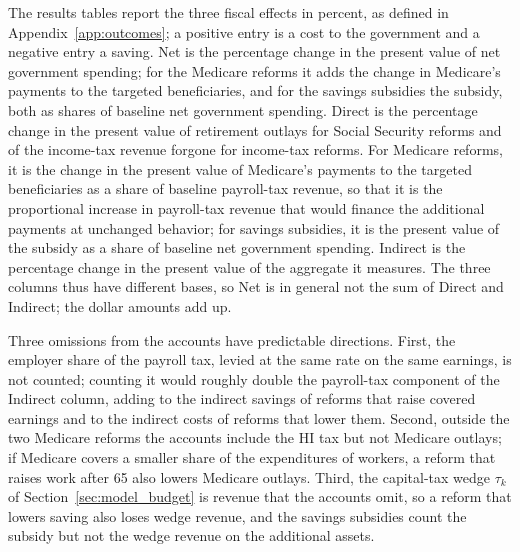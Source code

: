 The results tables report the three fiscal effects in percent, as defined in Appendix~\ref{app:outcomes}; a positive entry is a cost to the government and a negative entry a saving. Net is the percentage change in the present value of net government spending; for the Medicare reforms it adds the change in Medicare's payments to the targeted beneficiaries, and for the savings subsidies the subsidy, both as shares of baseline net government spending. Direct is the percentage change in the present value of retirement outlays for Social Security reforms and of the income-tax revenue forgone for income-tax reforms. For Medicare reforms, it is the change in the present value of Medicare's payments to the targeted beneficiaries as a share of baseline payroll-tax revenue, so that it is the proportional increase in payroll-tax revenue that would finance the additional payments at unchanged behavior; for savings subsidies, it is the present value of the subsidy as a share of baseline net government spending. Indirect is the percentage change in the present value of the aggregate it measures. The three columns thus have different bases, so Net is in general not the sum of Direct and Indirect; the dollar amounts add up.

Three omissions from the accounts have predictable directions. First, the employer share of the payroll tax, levied at the same rate on the same earnings, is not counted; counting it would roughly double the payroll-tax component of the Indirect column, adding to the indirect savings of reforms that raise covered earnings and to the indirect costs of reforms that lower them. Second, outside the two Medicare reforms the accounts include the HI tax but not Medicare outlays; if Medicare covers a smaller share of the expenditures of workers, a reform that raises work after 65 also lowers Medicare outlays. Third, the capital-tax wedge $\tau_k$ of Section~\ref{sec:model_budget} is revenue that the accounts omit, so a reform that lowers saving also loses wedge revenue, and the savings subsidies count the subsidy but not the wedge revenue on the additional assets.

